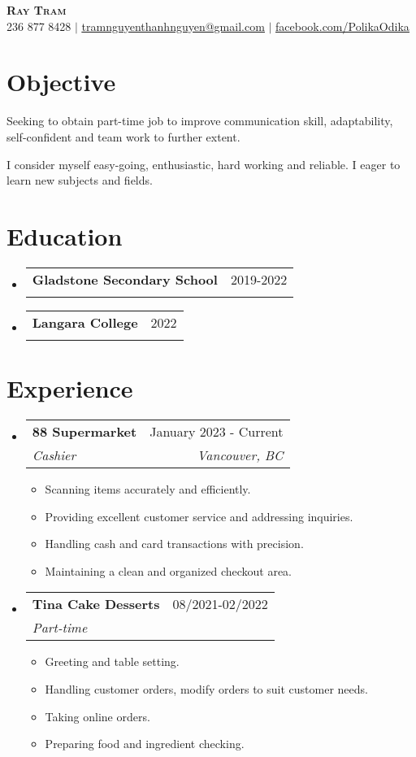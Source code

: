 \documentclass[letterpaper,11pt]{article}
\makeatletter
\newcommand{\resumeItem}[1]{
\item\small{
{#1 \vspace{-2pt}}
}
}
\newcommand{\resumeSubheading}[4]{
\vspace{-2pt}\item
\begin{tabular*}{0.97\textwidth}[t]{l@{\extracolsep{\fill}}r}
\textbf{#1} & #2 \\
\textit{\small#3} & \textit{\small #4} \\
\end{tabular*}\vspace{-7pt}
}
\newcommand{\resumeSubHeadingListStart}{\begin{itemize}[leftmargin=0.15in, label={}]}
\newcommand{\resumeSubHeadingListEnd}{\end{itemize}}
\newcommand{\resumeItemListStart}{\begin{itemize}}
\newcommand{\resumeItemListEnd}{\end{itemize}\vspace{-5pt}}
\makeatother
\begin{document}
\begin{center}
\textbf{\Huge \scshape Ray Tram} \\ \vspace{1pt}
\small 236 877 8428 $|$ \href{mailto:tramnguyenthanhnguyen@gmail.com}{\underline{tramnguyenthanhnguyen@gmail.com}} $|$
\href{https://www.facebook.com/PolikaOdika/}{\underline{facebook.com/PolikaOdika}}
\end{center}


\section{Objective} %
Seeking to obtain part-time job to improve communication skill, adaptability, self-confident and team work to further extent.

I consider myself easy-going, enthusiastic, hard working and reliable. I eager to learn new subjects and fields.

\section{Education}
\resumeSubHeadingListStart
\resumeSubheading{Gladstone Secondary School}{2019-2022}{}{}
\resumeSubheading{Langara College}{2022}{}{}
\resumeSubHeadingListEnd

\section{Experience}
\resumeSubHeadingListStart
\resumeSubheading{88 Supermarket}{January 2023 - Current}{Cashier}{Vancouver, BC}
\resumeItemListStart
\resumeItem{Scanning items accurately and efficiently.}
\resumeItem{Providing excellent customer service and addressing inquiries.}
\resumeItem{Handling cash and card transactions with precision.}
\resumeItem{Maintaining a clean and organized checkout area.}
\resumeItemListEnd
\resumeSubheading{Tina Cake Desserts}{08/2021-02/2022}{Part-time}{}
\resumeItemListStart
\resumeItem{Greeting and table setting.}
\resumeItem{Handling customer orders, modify orders to suit customer needs.}
\resumeItem{Taking online orders.}
\resumeItem{Preparing food and ingredient checking.}
\resumeItemListEnd
\resumeSubHeadingListEnd
\end{document}
